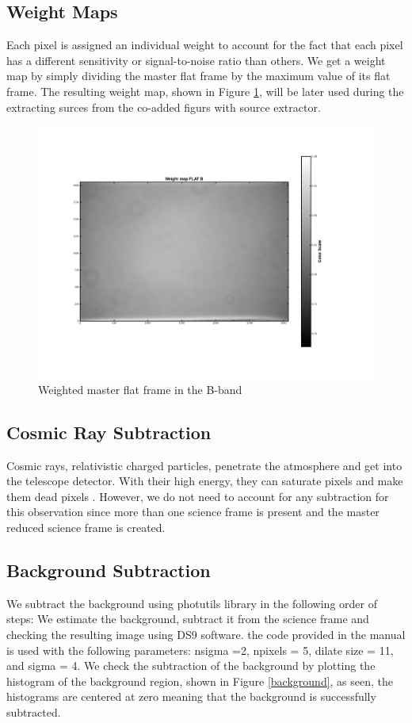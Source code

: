 \documentclass[12pt]{article}
\begin{document}
\subsection{Weight Maps}
Each pixel is assigned an individual weight to account for the fact that each pixel has a different sensitivity or signal-to-noise ratio than others. We get a weight map by simply dividing the master flat frame by the maximum value of its flat frame. The resulting weight map, shown in Figure \ref{weighted}, will be later used during the extracting surces from the co-added figurs with source extractor. 
\begin{figure}[H]
    \centering
    \includegraphics[width=\textwidth]{fig/weightmap_FLAT_B.png}
    \caption{ Weighted master flat frame in the B-band}
    \label{weighted}
\end{figure}

\subsection{Cosmic Ray Subtraction}
Cosmic rays, relativistic charged particles, penetrate the atmosphere and get into the telescope detector. With their high energy, they can saturate pixels and make them dead pixels \cite{lecturenote}. However, we do not need to account for any subtraction for this observation since more than one science frame is present and the master reduced science frame is created. 
\subsection{Background Subtraction}
We subtract the background using photutils library in the following order of steps: We estimate the background, subtract it from the science frame and checking the resulting image using DS9 software. the code provided in the manual is used with the following parameters: nsigma =2, npixels = 5, dilate size = 11, and sigma = 4. We check the subtraction of the background by plotting the histogram of the background region, shown in Figure \ref{background}, as seen, the histograms are centered at zero meaning that the background is successfully subtracted. 
\end{document}
